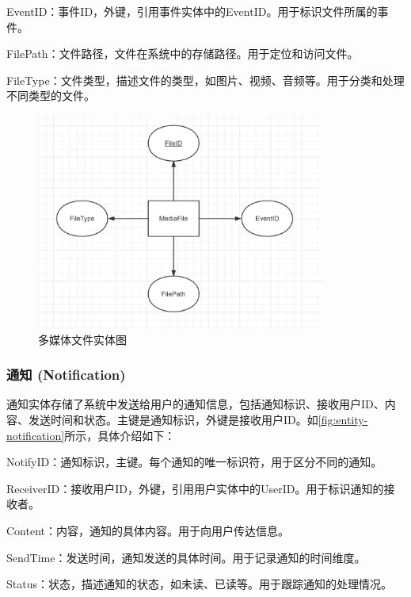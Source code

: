 EventID：事件ID，外键，引用事件实体中的EventID。用于标识文件所属的事件。

FilePath：文件路径，文件在系统中的存储路径。用于定位和访问文件。

FileType：文件类型，描述文件的类型，如图片、视频、音频等。用于分类和处理不同类型的文件。

\begin{figure}[htbp]
    \centering
    \includegraphics[width=0.85\textwidth]{figures/db-img-03.png}
    \caption{多媒体文件实体图}
    \label{fig:entity-mediafile}
\end{figure}

\subsubsection{通知 (Notification)}

通知实体存储了系统中发送给用户的通知信息，包括通知标识、接收用户ID、内容、发送时间和状态。主键是通知标识，外键是接收用户ID。如\cref{fig:entity-notification}所示，具体介绍如下：

NotifyID：通知标识，主键。每个通知的唯一标识符，用于区分不同的通知。

ReceiverID：接收用户ID，外键，引用用户实体中的UserID。用于标识通知的接收者。

Content：内容，通知的具体内容。用于向用户传达信息。

SendTime：发送时间，通知发送的具体时间。用于记录通知的时间维度。

Status：状态，描述通知的状态，如未读、已读等。用于跟踪通知的处理情况。

